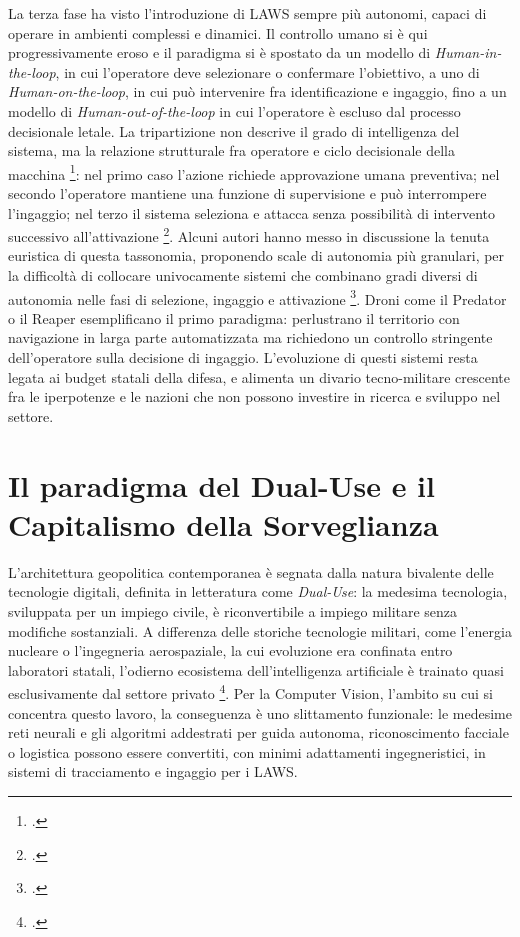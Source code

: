 \ifstampa\documentclass[a4paper,12pt,twoside,openright]{report}\else\documentclass[a4paper,12pt]{report}\fi
\newif\ifrevisione \revisionefalse
\DeclareRobustCommand{\rev}[1]{\ifrevisione{\color{blue!65!black}#1}\else#1\fi}
\begin{document}
La terza fase ha visto l'introduzione di LAWS sempre più autonomi, capaci di
operare in ambienti complessi e dinamici. Il controllo umano si è qui
progressivamente eroso e il paradigma si è spostato da un modello di
\textit{Human-in-the-loop}, in cui l'operatore deve selezionare o confermare
l'obiettivo, a uno di \textit{Human-on-the-loop}, in cui può intervenire fra
identificazione e ingaggio, fino a un modello di \textit{Human-out-of-the-loop}
in cui l'operatore è escluso dal processo decisionale letale. La
tripartizione non descrive il grado di intelligenza del sistema, ma la relazione
strutturale fra operatore e ciclo decisionale della macchina
\footcite{horowitz_scharre_2015}: nel primo caso l'azione richiede approvazione
umana preventiva; nel secondo l'operatore mantiene una funzione di supervisione
e può interrompere l'ingaggio; nel terzo il sistema seleziona e attacca senza
possibilità di intervento successivo all'attivazione \footcite{kallenborn_2021}.
Alcuni autori hanno messo in discussione la tenuta euristica di questa
tassonomia, proponendo scale di autonomia più granulari, per la difficoltà di
collocare univocamente sistemi che combinano gradi diversi di autonomia nelle
fasi di selezione, ingaggio e attivazione \footcite{sharkey_2016}. Droni come
il Predator o il Reaper esemplificano il primo paradigma: perlustrano il
territorio \rev{con navigazione in larga parte automatizzata} ma richiedono un controllo stringente
dell'operatore sulla decisione di ingaggio. L'evoluzione di questi sistemi resta
legata ai budget statali della difesa, e alimenta un divario tecno-militare
crescente fra le iperpotenze e le nazioni che non possono investire in ricerca e
sviluppo nel settore.
 
\section{Il paradigma del Dual-Use e il Capitalismo della Sorveglianza}
 
L'architettura geopolitica contemporanea è segnata dalla natura bivalente delle
tecnologie digitali, definita in letteratura come \textit{Dual-Use}: la medesima tecnologia,
sviluppata per un impiego civile, è riconvertibile a impiego militare senza
modifiche sostanziali. A
differenza delle storiche tecnologie militari, come l'energia nucleare o
l'ingegneria aerospaziale, la cui evoluzione era confinata entro laboratori statali, l'odierno ecosistema dell'intelligenza artificiale è trainato quasi
esclusivamente dal settore privato \footcite{aiindex_2024}. \rev{Per la Computer Vision, l'ambito su cui si concentra questo lavoro, la conseguenza è uno slittamento funzionale: le medesime reti neurali e gli algoritmi} addestrati per guida autonoma,
riconoscimento facciale o logistica possono essere convertiti, con minimi
adattamenti ingegneristici, in sistemi di tracciamento e ingaggio per i LAWS.
 
\end{document}

